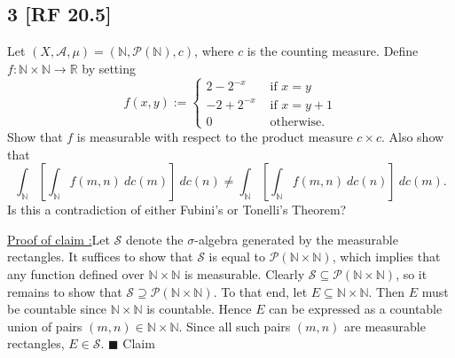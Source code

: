 \documentclass[12pt]{article}
\newcounter{ProofCounter}
\newcounter{ClaimCounter}[ProofCounter]
\newenvironment{claim}[1]{\vspace{1mm}\stepcounter{ClaimCounter}\par\noindent\underline{\bf Claim \theClaimCounter:}\space#1}{}
\newenvironment{claimproof}[1]{\par\noindent\underline{Proof of claim \theClaimCounter:}\space#1}{\hfill $\blacksquare$ Claim \theClaimCounter}
\begin{document}
\newpage
\subsection*{3 [RF 20.5]}
\begin{tcolorbox}
Let $(X,\mathcal{A},\mu) = (\mathbb{N}, \mathcal{P}(\mathbb{N}), c)$, where $c$ is the counting measure. Define $f : \mathbb{N} \times \mathbb{N}
\rightarrow \mathbb{R}$ by setting 
\[ f(x,y) := \left\{ \begin{array}{cl}
2 - 2^{-x} & \text{ if } x = y \\
-2 + 2^{-x} & \text{ if } x = y + 1 \\
0 & \text{ otherwise. }
\end{array} \right.
\]
Show that $f$ is measurable with respect to the product measure $c\times c$. Also show that 
\[ \int_{\mathbb{N}}\left[ \int_{\mathbb{N}}f(m,n)\ dc(m) \right]\ dc(n) \neq \int_{\mathbb{N}}\left[ \int_{\mathbb{N}}f(m,n)\ dc(n) \right]\ dc(m).\]
Is this a contradiction of either Fubini's or Tonelli's Theorem?
\end{tcolorbox}
\begin{claimproof}
Let $\mathcal{S}$ denote the $\sigma$-algebra generated by the measurable rectangles.
It suffices to show that $\mathcal{S}$ is equal to $\mathcal{P}(\mathbb{N}\times \mathbb{N})$, which implies that any function defined over
$\mathbb{N}\times\mathbb{N}$ is measurable. Clearly $\mathcal{S} \subseteq
\mathcal{P}(\mathbb{N}\times\mathbb{N})$, so it remains to show that $\mathcal{S} \supseteq \mathcal{P}(\mathbb{N}\times\mathbb{N})$. To that end, let
$E \subseteq \mathbb{N}\times\mathbb{N}$. Then $E$ must be countable since $\mathbb{N}\times \mathbb{N}$ is countable. Hence $E$ can be expressed as a
countable union of pairs $(m,n) \in \mathbb{N}\times\mathbb{N}$. Since all such pairs $(m,n)$ are measurable rectangles, $E \in \mathcal{S}$.
\end{claimproof}
\end{document}

